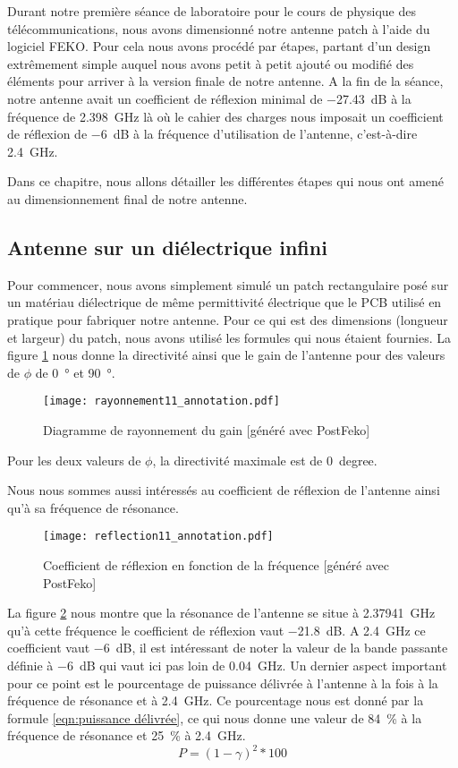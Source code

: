 Durant notre première séance de laboratoire pour le cours de physique des télécommunications, nous avons dimensionné notre antenne patch à l'aide du logiciel FEKO. Pour cela nous avons procédé par étapes, partant d'un design extrêmement simple auquel nous avons petit à petit ajouté ou modifié des éléments pour arriver à la version finale de notre antenne.
A la fin de la séance, notre antenne avait un coefficient de réflexion minimal de \SI{-27.43}{\deci\bel} à la fréquence de \SI{2.398}{\giga\hertz} là où le cahier des charges nous imposait un coefficient de réflexion de \SI{-6}{\deci\bel} à la fréquence d'utilisation de l'antenne, c'est-à-dire \SI{2.4}{\giga\hertz}.

Dans ce chapitre, nous allons détailler les différentes étapes qui nous ont amené au dimensionnement final de notre antenne.


\subsection{Antenne sur un diélectrique infini}
Pour commencer, nous avons simplement simulé un patch rectangulaire posé sur un matériau diélectrique de même permittivité électrique que le PCB utilisé en pratique pour fabriquer notre antenne. Pour ce qui est des dimensions (longueur et largeur) du patch, nous avons utilisé les formules qui nous étaient fournies. La figure \ref{fig:rayonnement_11} nous donne la directivité ainsi que le gain de l'antenne pour des valeurs de $\phi$ de \SI{0}{\degree} et \SI{90}{\degree}.
\begin{figure}[htbp]
  \centering
  \texttt{[image: rayonnement11\_annotation.pdf]}
  \caption{Diagramme de rayonnement du gain [généré avec PostFeko]\label{fig:rayonnement_11}}
\end{figure}
Pour les deux valeurs de $\phi$, la directivité maximale est de \SI{0}{degree}.

Nous nous sommes aussi intéressés au coefficient de réflexion de l'antenne ainsi qu'à sa fréquence de résonance.
\begin{figure}[htbp]
  \centering
  \texttt{[image: reflection11\_annotation.pdf]}
  \caption{Coefficient de réflexion en fonction de la fréquence [généré avec PostFeko]\label{fig:reflection11_}}
\end{figure}
La figure \ref{fig:reflection11_} nous montre que la résonance de l'antenne se situe à \SI{2.37941}{\giga\hertz} qu'à cette fréquence le coefficient de réflexion vaut \SI{-21.8}{\deci\bel}. A \SI{2.4}{\giga\hertz} ce coefficient vaut \SI{-6}{\deci\bel}, il est intéressant de noter la valeur de la bande passante définie à \SI{-6}{\deci\bel} qui vaut ici pas loin de \SI{0.04}{\giga\hertz}. Un dernier aspect important pour ce point est le pourcentage de puissance délivrée à l'antenne à la fois à la fréquence de résonance et à \SI{2.4}{\giga\hertz}. Ce pourcentage nous est donné par la formule \ref{eqn:puissance délivrée}, ce qui nous donne une valeur de \SI{84}{\percent} à la fréquence de résonance et \SI{25}{\percent} à \SI{2.4}{\giga\hertz}.
\begin{equation}
P = {(1-\gamma)^2}*100
\label{eqn:puissance délivrée}
\end{equation}